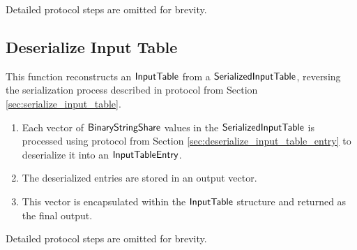 Detailed protocol steps are omitted for brevity.

\subsection{Deserialize Input Table} 
\label{sec:deserialize_input_table}

This function reconstructs an ${\mathsf{InputTable}}$ from a ${\mathsf{SerializedInputTable}}$, reversing the serialization process described in protocol from Section \ref{sec:serialize_input_table}.

\begin{enumerate}
    \item Each vector of ${\mathsf{BinaryStringShare}}$ values in the ${\mathsf{SerializedInputTable}}$ is processed using protocol from Section \ref{sec:deserialize_input_table_entry} to deserialize it into an ${\mathsf{InputTableEntry}}$.
    \item The deserialized entries are stored in an output vector.
    \item This vector is encapsulated within the ${\mathsf{InputTable}}$ structure and returned as the final output.
\end{enumerate}

Detailed protocol steps are omitted for brevity.